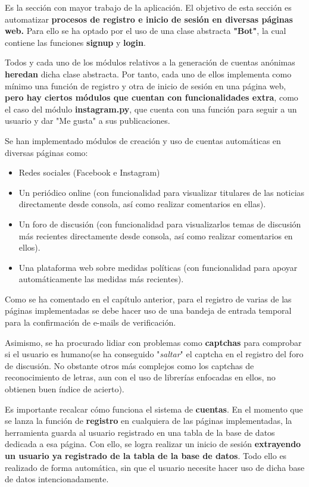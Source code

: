 Es la sección con mayor trabajo de la aplicación. El objetivo de esta sección es automatizar \textbf{procesos de registro e inicio de sesión en diversas páginas web.}
Para ello se ha optado por el uso de una clase abstracta \textbf{"Bot"}, la cual contiene las funciones \textbf{signup} y \textbf{login}.

Todos y cada uno de los módulos relativos a la generación de cuentas anónimas \textbf{heredan} dicha clase abstracta. Por tanto, cada uno de ellos implementa como mínimo una función de registro y otra de inicio de sesión en una página web, \textbf{pero hay ciertos módulos que cuentan con funcionalidades extra}, como el caso del módulo \textbf{instagram.py}, que cuenta con una función para seguir a un usuario y dar "Me gusta" a sus publicaciones. 

Se han implementado módulos de creación y uso de cuentas automáticas en diversas páginas como:

\begin{itemize}
	\item Redes sociales (Facebook e Instagram)
	\item Un periódico online (con funcionalidad para visualizar titulares de las noticias directamente desde consola, así como realizar comentarios en ellas).
	\item Un foro de discusión (con funcionalidad para visualizarlos temas de discusión más recientes directamente desde consola, así como realizar comentarios en ellos).
	\item Una plataforma web sobre medidas políticas (con funcionalidad para apoyar automáticamente las medidas más recientes).
\end{itemize}

Como se ha comentado en el capítulo anterior, para el registro de varias de las páginas implementadas se debe hacer uso de una bandeja de entrada temporal para la confirmación de e-mails de verificación.
 
Asimismo, se ha procurado lidiar con problemas como \textbf{captchas} para comprobar si el usuario es humano(se ha conseguido "\textit{saltar}" el captcha en el registro del foro de discusión. No obstante otros más complejos como los captchas de reconocimiento de letras, aun con el uso de librerías enfocadas en ellos, no obtienen buen índice de acierto). 

Es importante recalcar cómo funciona el sistema de \textbf{cuentas}. En el momento que se lanza la función de \textbf{registro} en cualquiera de las páginas implementadas, la herramienta guarda al usuario registrado en una tabla de la base de datos dedicada a esa página. Con ello, se logra realizar un inicio de sesión \textbf{extrayendo un usuario ya registrado de la tabla de la base de datos}. Todo ello es realizado de forma automática, sin que el usuario necesite hacer uso de dicha base de datos intencionadamente.

